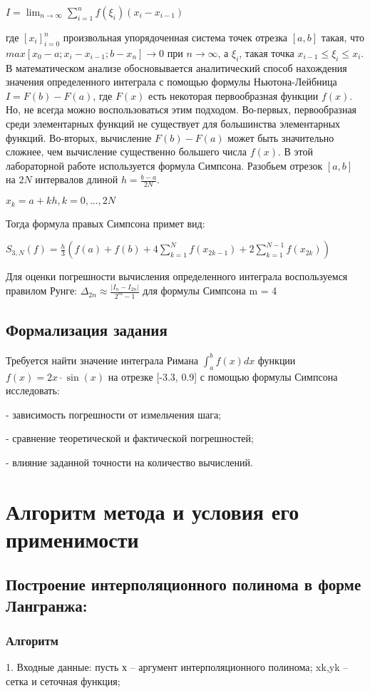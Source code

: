 \documentclass{article}
\begin{document}
	$I =  \lim_{n\to\infty} \sum_{i=1}^{n} f(\xi_i) (x_i-x_{i-1}) $
	
	где $[x_i]^n_{i=0}$ произвольная упорядоченная система точек отрезка $[a,b]$ такая, что $max[x_0-a;x_i-x_{i-1};b-x_n] \to 0$ при $n \to \infty$, а $\xi_i$, такая точка $x_{i-1} \leq \xi_i \leq x_i$.
	В математическом анализе обосновывается аналитический способ нахождения значения определенного
	интеграла с помощью формулы Ньютона-Лейбница $I = F(b)-F(a)$, где $F(x)$ есть некоторая первообразная
	функции $f(x)$.
	Но, не всегда можно воспользоваться этим подходом. Во-первых, первообразная среди элементарных
	функций не существует для большинства элементарных функций. Во-вторых, вычисление $F(b)-F(a)$
	может быть значительно сложнее, чем вычисление существенно большего числа $f(x)$.
	В этой лабораторной работе используется формула Симпсона.
	Разобьем отрезок $[a,b]$ на $2N$ интервалов длиной $h = \frac{b-a}{2N}$.
	
	$x_k = a + kh, k = 0,...,2N$

	Тогда формула правых Симпсона примет вид:
	
	$S_{3,N}(f) = \frac{h}{3}(f(a)+f(b)+4\sum_{k=1}^{N}f(x_{2k-1})+2\sum_{k=1}^{N-1}f(x_{2k}))$
	
	Для оценки погрешности вычисления определенного интеграла воспользуемся правилом Рунге:
	$\Delta_{2n} \approx \frac{|I_n-I_{2n}|}{2^m-1}$
	для формулы Симпсона m = 4
	
	\subsection{Формализация задания}
		Требуется найти значение интеграла Римана $\int_a^b f(x)dx$ функции $f(x) = 2x \cdot \sin(x)$ на отрезке [-3.3, 0.9] с помощью формулы Симпсона исследовать:
	
	- зависимость погрешности от измельчения шага;
	
	- сравнение теоретической и фактической погрешностей;
	
	- влияние заданной точности на количество вычислений.
	\section{Алгоритм метода и условия его применимости}   

	\subsection{Построение интерполяционного полинома в форме Лангранжа:}
	\subsubsection{Алгоритм}
	1. Входные данные: пусть х – аргумент интерполяционного полинома; xk,yk – сетка и сеточная функция;  
	
\end{document}
